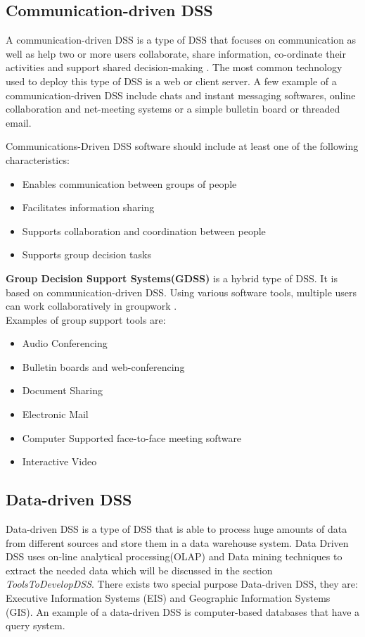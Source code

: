 \subsection{Communication-driven DSS}
\label{subsec:CommunicationDrivenDSS}
\indent A communication-driven DSS is a type of DSS that focuses on communication as well as help two or more users collaborate, share information, co-ordinate their activities and support shared decision-making \cite{DDSTypes}. The most common technology used to deploy this type of DSS is a web or client server. A few example of a communication-driven DSS include chats and instant messaging softwares, online collaboration and net-meeting systems or a simple bulletin board or threaded email.

\indent Communications-Driven DSS software should include at least one of the following characteristics:
\begin{itemize}
	\itemsep0em 
	\item Enables communication between groups of people
	\item Facilitates information sharing
	\item Supports collaboration and coordination between people
	\item Supports group decision tasks
\end{itemize}
\textbf{Group Decision Support Systems(GDSS)} is a hybrid type of DSS. It is based on communication-driven DSS. Using various software tools, multiple users can work collaboratively in groupwork \cite{DDSTypes}.\\
Examples of group support tools are: 
\begin{itemize}
	\itemsep0em 
	\item Audio Conferencing
	\item Bulletin boards and web-conferencing
	\item Document Sharing
	\item Electronic Mail
	\item Computer Supported face-to-face meeting software 
	\item Interactive Video
\end{itemize}
\subsection{Data-driven DSS}
\label{subsec:DataDrivenDSS}
\indent Data-driven DSS is a type of DSS that is able to process huge amounts of data from different sources and store them in a data warehouse system. Data Driven DSS uses on-line analytical processing(OLAP) and Data mining techniques to extract the needed data which will be discussed in the section \textit{ToolsToDevelopDSS}. There exists two special purpose Data-driven DSS, they are: Executive Information Systems (EIS) and Geographic Information Systems (GIS). An example of a data-driven DSS is computer-based databases that have a query system.

